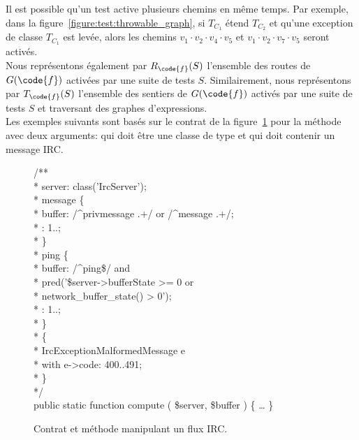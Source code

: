 Il est possible qu'un test active plusieurs chemins en même temps. Par exemple,
dans la figure~\ref{figure:test:throwable_graph}, si $T_{C_1}$ étend $T_{C_2}$
et qu'une exception de classe $T_{C_1}$ est levée, alors les chemins $v_1 \cdot
v_2 \cdot v_4 \cdot v_5$ et $v_1 \cdot v_2 \cdot v_7 \cdot v_5$ seront activés.
\\

Nous représentons également par $R_\code{f}(S)$ l'ensemble des routes de
$G(\code{f})$ activées par une suite de tests $S$. Similairement, nous
représentons par $T_\code{f}(S)$ l'ensemble des sentiers de $G(\code{f})$
activés par une suite de tests $S$ et traversant des graphes d'expressions. \\

Les exemples suivants sont basés sur le contrat de la
figure~\ref{figure:test:irc} pour la méthode  avec deux arguments:
 qui doit être une classe de type
 et  qui doit contenir un message
IRC.
%
\begin{figure}

\begin{bigpre}
/** \\
 * \arequires server: class('\bslash{}Irc\bslash{}Server'); \\
 * \abehavior message \{ \\
 *     \arequires buffer: /^privmessage .+/ or /^message .+/; \\
 *     \aensures  \aresult: 1..; \\
 * \} \\
 * \abehavior ping \{ \\
 *     \arequires buffer: /^ping\$/ and \\
 *               \bslash{}pred('\$server->bufferState   >= 0 or \\
 *                      network\_buffer\_state() >  0'); \\
 *     \aensures  \aresult: 1..; \\
 * \} \\
 * \adefault \{ \\
 *     \athrowable \bslash{}Irc\bslash{}Exception\bslash{}MalformedMessage e \\
 *                    with e->code: 400..491; \\
 * \} \\
 */ \\
public static function compute ( \$server, \$buffer ) \{ … \}
\end{bigpre}

\caption{\label{figure:test:irc} Contrat et méthode manipulant un flux IRC.}

\end{figure}
